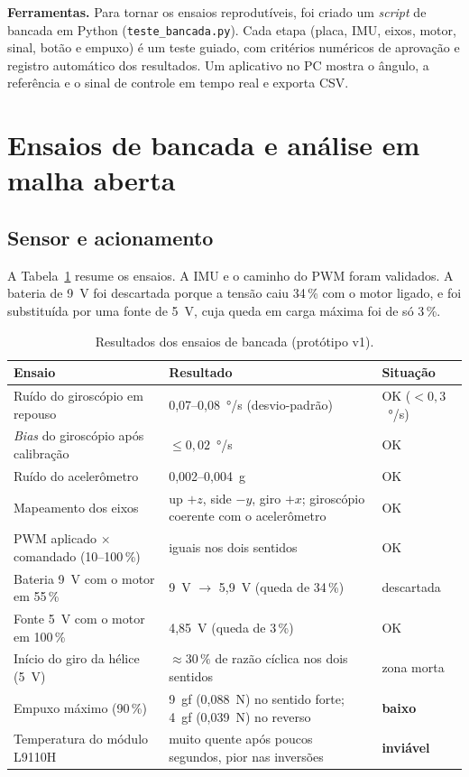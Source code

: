 \documentclass[a4paper,11pt]{article}
\begin{document}
\textbf{Ferramentas.} Para tornar os ensaios reprodutíveis, foi criado um \textit{script} de bancada
em Python (\texttt{teste\_bancada.py}). Cada etapa (placa, IMU, eixos, motor, sinal, botão e empuxo)
é um teste guiado, com critérios numéricos de aprovação e registro automático dos resultados. Um
aplicativo no PC mostra o ângulo, a referência e o sinal de controle em tempo real e exporta CSV.

\section{Ensaios de bancada e análise em malha aberta}
\label{sec:ensaios}

\subsection{Sensor e acionamento}

A Tabela~\ref{tab:ensaios} resume os ensaios. A IMU e o caminho do PWM foram validados. A bateria de
9~V foi descartada porque a tensão caiu 34\,\% com o motor ligado, e foi substituída por uma
fonte de 5~V, cuja queda em carga máxima foi de só 3\,\%.

\begin{table}[H]
\centering\small
\caption{Resultados dos ensaios de bancada (protótipo v1).}
\label{tab:ensaios}
\begin{tabularx}{\textwidth}{@{}l>{\raggedright}Xl@{}}
\toprule
\textbf{Ensaio} & \textbf{Resultado} & \textbf{Situação} \\
\midrule
Ruído do giroscópio em repouso & 0,07--0,08~°/s (desvio-padrão) & OK ($<0{,}3$~°/s) \\
\textit{Bias} do giroscópio após calibração & $\le 0{,}02$~°/s & OK \\
Ruído do acelerômetro & 0,002--0,004~g & OK \\
Mapeamento dos eixos & up $+z$, side $-y$, giro $+x$; giroscópio coerente com o acelerômetro & OK \\
PWM aplicado $\times$ comandado (10--100\,\%) & iguais nos dois sentidos & OK \\
Bateria 9~V com o motor em 55\,\% & 9~V $\rightarrow$ 5,9~V (queda de 34\,\%) & descartada \\
Fonte 5~V com o motor em 100\,\% & 4,85~V (queda de 3\,\%) & OK \\
Início do giro da hélice (5~V) & $\approx 30\,\%$ de razão cíclica nos dois sentidos & zona morta \\
Empuxo máximo (90\,\%) & 9~gf (0,088~N) no sentido forte; 4~gf (0,039~N) no reverso & \textbf{baixo} \\
Temperatura do módulo L9110H & muito quente após poucos segundos, pior nas inversões & \textbf{inviável} \\
\bottomrule
\end{tabularx}
\end{table}
\end{document}
